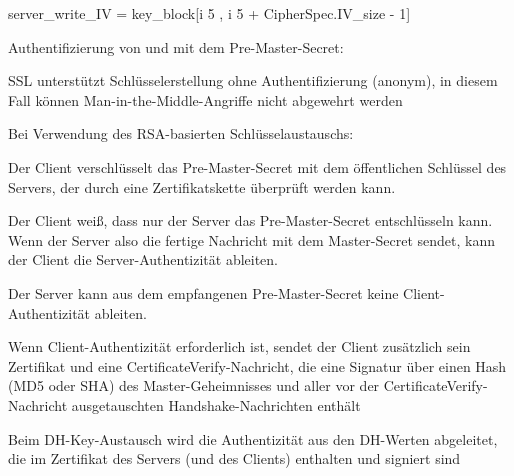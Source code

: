 \documentclass[a4paper]{article}
\begin{document}
\begin{multicols}{3}
\begin{itemize*}
\begin{itemize*}
\begin{itemize*}
                        \item server\_write\_IV = key\_block{[}i 5 , i 5 + CipherSpec.IV\_size - 1{]}
                  \end{itemize*}
                  \item       Authentifizierung von und mit dem Pre-Master-Secret:
                  \begin{itemize*}
                        \item SSL unterstützt Schlüsselerstellung ohne Authentifizierung (anonym), in diesem Fall können Man-in-the-Middle-Angriffe nicht abgewehrt werden
                        \item Bei Verwendung des RSA-basierten Schlüsselaustauschs:
                        \begin{itemize*} \item Der Client verschlüsselt das Pre-Master-Secret mit dem öffentlichen Schlüssel des Servers, der durch eine Zertifikatskette überprüft werden kann. \item Der Client weiß, dass nur der Server das Pre-Master-Secret entschlüsseln kann. Wenn der Server also die fertige Nachricht mit dem Master-Secret sendet, kann der Client die Server-Authentizität ableiten. \item Der Server kann aus dem empfangenen Pre-Master-Secret keine Client-Authentizität ableiten. \item Wenn Client-Authentizität erforderlich ist, sendet der Client zusätzlich sein Zertifikat und eine CertificateVerify-Nachricht, die eine Signatur über einen Hash (MD5 oder SHA) des Master-Geheimnisses und aller vor der CertificateVerify-Nachricht ausgetauschten Handshake-Nachrichten enthält \end{itemize*}
                        \item Beim DH-Key-Austausch wird die Authentizität aus den DH-Werten abgeleitet, die im Zertifikat des Servers (und des Clients) enthalten und signiert sind
                  \end{itemize*}
            \end{itemize*}


\end{itemize*}
\end{multicols}
\end{document}
